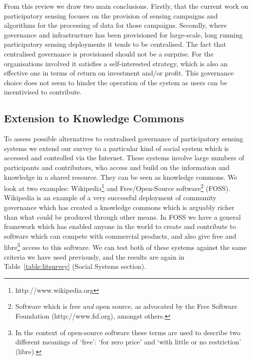 

From this review we draw two main conclusions. Firstly, that the current work on participatory sensing focuses on the provision of sensing campaigns and algorithms for the processing of data for those campaigns. Secondly, where governance and infrastructure has been provisioned for large-scale, long running participatory sensing deployments it tends to be centralised. The fact that centralised governance is provisioned should not be a surprise. 
For the organisations involved it satisfies a self-interested strategy, which is also an effective one in terms of return on investment and/or profit. 
This governance choice does not seem to hinder the operation of the system as users can be incentivised to contribute.

\subsection{Extension to Knowledge Commons}

To assess possible alternatives to centralised governance of participatory sensing systems we extend our survey to a particular kind of social system which is accessed and controlled via the Internet. 
These systems involve large numbers of participants and contributors, who access and build on the information and knowledge in a shared resource. They can be seen as knowledge commons. We look at two examples: Wikipedia\footnote{http://www.wikipedia.org} and Free/Open-Source software\footnote{Software which is free \emph{and} open source, as advocated by the Free Software Foundation (http://www.fsf.org), amongst others.} (FOSS). Wikipedia is an example of a very successful deployment of community governance which has created a knowledge commons which is arguably richer than what could be produced through other means. 
In FOSS we have a general framework which has enabled anyone in the world to create and contribute to software which can compete with commercial products, and also give free and libre\footnote{In the context of open-source software these terms are used to describe two different meanings of `free': `for zero price' and `with little or no restriction' (libre).} access to this software. 
We can test both of these systems against the same criteria we have used previously, and the results are again in Table~\ref{table:litsurvey} (Social Systems section).

